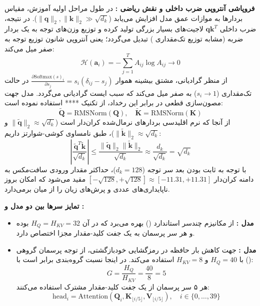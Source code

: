 \textbf{فروپاشی آنتروپی ضرب داخلی و نقش ریاضی :}
در طول مراحل اولیه آموزش، مقیاس بردارها به موازات عمق مدل افزایش می‌یابد ($\|\mathbf{q}\|_2, \|\mathbf{k}\|_2 \gg \sqrt{d_k}$). در نتیجه، ضرب داخلی $\mathbf{q} \mathbf{k}^T$ لاجیت‌های بسیار بزرگی تولید کرده و توزیع وزن‌های توجه به یک بردار ضربه (مشابه توزیع تک‌مقداری ) تبدیل می‌گردد؛ یعنی آنتروپی شانون توزیع توجه به صفر میل می‌کند:
\begin{equation}
    \mathcal{H}(\mathbf{a}_i) = -\sum_{j=1}^T A_{ij} \log A_{ij} \to 0
\end{equation}
از منظر گرادیانی، مشتق بیشینه هموار $\frac{\partial \text{Softmax}(s)_i}{\partial s_j} = s_i(\delta_{ij} - s_j)$ در حالت تک‌مقداری ($s_i \to 1$) به صفر میل می‌کند که سبب ایست گرادیانی می‌گردد. مدل  جهت مصون‌سازی قطعی در برابر این رخداد، از تکنیک **** \cite{dehghani2023scaling} استفاده نموده است:
\begin{equation}
    \tilde{\mathbf{Q}} = \text{RMSNorm}(\mathbf{Q}), \quad \tilde{\mathbf{K}} = \text{RMSNorm}(\mathbf{K})
\end{equation}
از آنجا که نرم اقلیدسی بردارهای نرمال‌شده کران‌دار است ($\|\tilde{\mathbf{q}}\|_2 \approx \sqrt{d_k}$ و $\|\tilde{\mathbf{k}}\|_2 \approx \sqrt{d_k}$)، طبق نامساوی کوشی-شوارتز داریم:
\begin{equation}
    \left| \frac{\tilde{\mathbf{q}}^T \tilde{\mathbf{k}}}{\sqrt{d_k}} \right| \le \frac{\|\tilde{\mathbf{q}}\|_2 \|\tilde{\mathbf{k}}\|_2}{\sqrt{d_k}} \approx \frac{d_k}{\sqrt{d_k}} = \sqrt{d_k}
\end{equation}
با توجه به ثابت بودن بعد سر توجه ($d_k = 128$)، حداکثر مقدار ورودی سافت‌مکس به دامنه کران‌دار $[-\sqrt{128}, +\sqrt{128}] \approx [-11.31, +11.31]$ مقید می‌شود که امکان بروز ناپایداری‌های عددی و پرش‌های زیان را از میان برمی‌دارد.

\textbf{تمایز سرها بین دو مدل  و :}
\begin{itemize}
    \item \textbf{مدل :} از مکانیزم چندسر استاندارد () بهره می‌برد که در آن $H_Q = H_{KV} = 32$ بوده و هر سر پرسمان به یک جفت کلید-مقدار مجزا اختصاص دارد.
    \item \textbf{مدل :} جهت کاهش بار حافظه در رمزگشایی خودبازگشتی، از توجه پرسمان گروهی () با $H_Q = 40$ و $H_{KV} = 8$ استفاده می‌کند. در اینجا نسبت گروه‌بندی برابر است با:
    \begin{equation}
        G = \frac{H_Q}{H_{KV}} = \frac{40}{8} = 5
    \end{equation}
    هر ۵ سر پرسمان از یک جفت کلید-مقدار مشترک استفاده می‌کنند:
    \begin{equation}
        \text{head}_i = \text{Attention}\left( \mathbf{Q}_i, \mathbf{K}_{\lfloor i/5 \rfloor}, \mathbf{V}_{\lfloor i/5 \rfloor} \right), \quad i \in \{0, \dots, 39\}
    \end{equation}
\end{itemize}

